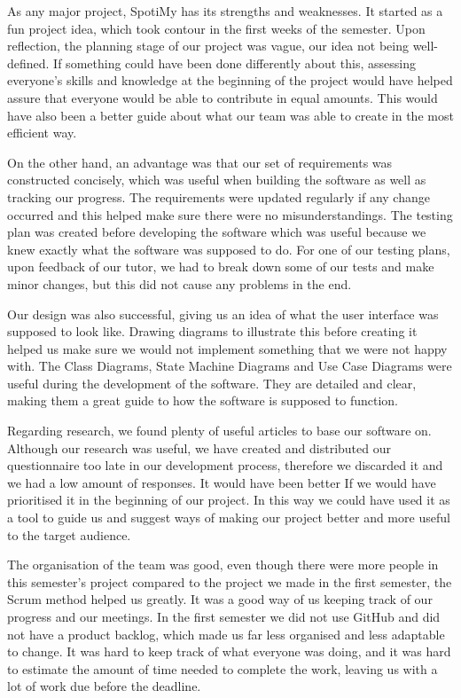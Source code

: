 \documentclass[10pt, notitlepage]{report}
\begin{document}
As any major project, SpotiMy has its strengths and weaknesses. It started as a fun project idea, which took contour in the first weeks of the semester. Upon reflection, the planning stage of our project was vague, our idea not being well-defined. If something could have been done differently about this, assessing everyone’s skills and knowledge at the beginning of the project would have helped assure that everyone would be able to contribute in equal amounts. This would have also been a better guide about what our team was able to create in the most efficient way. 

On the other hand, an advantage was that our set of requirements was constructed concisely, which was useful when building the software as well as tracking our progress. The requirements were updated regularly if any change occurred and this helped make sure there were no misunderstandings. The testing plan was created before developing the software which was useful because we knew exactly what the software was supposed to do. For one of our testing plans, upon feedback of our tutor, we had to break down some of our tests and 
make minor changes, but this did not cause any problems in the end. 

Our design was also successful, giving us an idea of what the user interface was supposed to look like. Drawing diagrams to illustrate this before creating it helped us make sure we would not implement something that we were not happy with. The Class Diagrams, State Machine Diagrams and Use Case Diagrams were useful during the development of the software. They are detailed and clear, making them a great guide to how the software is supposed to function. 

Regarding research, we found plenty of useful articles to base our software on. Although our research was useful, we have created and distributed our questionnaire too late in our development process, therefore we discarded it and we had a low amount of responses. It would have been better If we would have prioritised it in the beginning of our project. In this way we could have used it as a tool to guide us and suggest ways of making our project better and more useful to the target audience. 

The organisation of the team was good, even though there were more people in this semester’s project compared to the project we made in the first semester, the Scrum method helped us greatly. It was a good way of us keeping track of our progress and our meetings. In the first semester we did not use GitHub and did not have a product backlog, which made us far less organised and less adaptable to change. It was hard to keep track of what everyone was doing, and it was hard to estimate the amount of time needed to complete the work, leaving us with a lot of work due before the deadline. 
\end{document}
